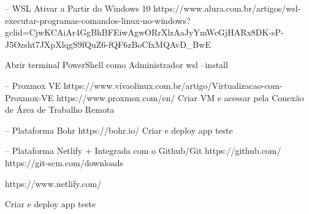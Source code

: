 -- WSL Ativar a Partir do Windows 10
https://www.alura.com.br/artigos/wsl-executar-programas-comandos-linux-no-windows?gclid=CjwKCAiAr4GgBhBFEiwAgwORrXlzAaJyYmWcGjHARx8DK-sP-J5Ozsht7JXpXlqgS9fQuZ6-fQF6zBoCfxMQAvD_BwE

Abrir terminal PowerShell como Administrador
wsl --install

-- Proxmox VE
https://www.vivaolinux.com.br/artigo/Virtualizacao-com-Proxmox-VE
https://www.proxmox.com/en/
Criar VM e acessar pela Conexão de Área de Trabalho Remota

-- Plataforma Bohr
https://bohr.io/
Criar e deploy app teste

-- Plataforma Netlify + Integrada com o Github/Git
https://github.com/
https://git-scm.com/downloads

https://www.netlify.com/

Criar e deploy app teste